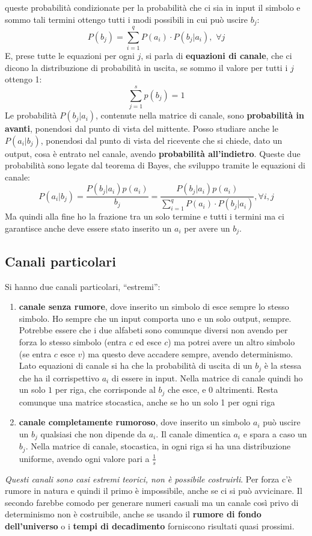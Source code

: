 \documentclass[a4paper,12pt, oneside]{book}
\begin{document}
queste probabilità condizionate per la probabilità che ci sia in input il
simbolo e sommo tali termini ottengo tutti i modi possibili in cui può uscire
$b_j$:
\[P(b_j)=\sum_{i=1}^q P(a_i)\cdot P(b_j|a_i),\,\,\forall j\]
E, prese tutte le equazioni per ogni $j$, si parla di \textbf{equazioni di
  canale}, che ci dicono la distribuzione di probabilità in uscita, se sommo il
valore per tutti i $j$ ottengo 1:
\[\sum_{j=1}^s p(b_j)=1\]
Le probabilità $P(b_j|a_i)$, contenute nella matrice di canale, sono
\textbf{probabilità in avanti}, ponendosi dal punto di vista del mittente. Posso
studiare anche le $P(a_i|b_j)$, ponendosi dal 
punto di vista del ricevente che si chiede, dato un output, cosa è entrato nel
canale, avendo \textbf{probabilità all'indietro}. Queste due probabilità
sono legate dal teorema di Bayes, che sviluppo tramite le equazioni di canale:
\[P(a_i|b_j)=\frac{P(b_j|a_i)p(a_i)}{b_j}=\frac{P(b_j|a_i)p(a_i)}{\sum_{i=1}^q
    P(a_i)\cdot P(b_j|a_i)},\forall i,j\]
Ma quindi alla fine ho la frazione tra un solo termine e tutti i termini ma ci
garantisce anche deve essere stato inserito un $a_i$ per avere un $b_j$.
\subsection{Canali particolari}
Si hanno due canali particolari, ``estremi'':
\begin{enumerate}
  \item \textbf{canale senza rumore}, dove inserito un simbolo di esce
  sempre lo stesso simbolo. Ho sempre che un input comporta uno e un solo
  output, sempre. Potrebbe essere che i due alfabeti sono comunque diversi non
  avendo per forza lo stesso simbolo (entra $c$ ed esce $c$) ma potrei avere un
  altro simbolo (se entra $c$ esce $v$) ma questo deve accadere sempre, avendo
  determinismo. Lato equazioni di canale si ha che la probabilità di uscita di 
  un $b_j$ è la stessa che ha il corrispettivo $a_i$ di essere in input. Nella
  matrice di canale quindi ho un solo $1$ per riga, che corrisponde al $b_j$ che
  esce, e 0 altrimenti. Resta comunque una matrice stocastica, anche se ho un
  solo 1 per ogni riga
  \item \textbf{canale completamente rumoroso}, dove inserito un simbolo $a_i$
  può uscire un $b_j$ qualsiasi che non dipende da $a_i$. Il canale dimentica
  $a_i$ e spara a caso un $b_j$. Nella matrice di canale, stocastica, in ogni
  riga si ha una 
  distribuzione uniforme, avendo ogni valore pari a $\frac{1}{s}$
\end{enumerate}
\textit{Questi canali sono casi estremi teorici, non è possibile
  costruirli}. Per forza c'è rumore in natura e quindi il primo è
impossibile, anche se ci si può avvicinare. Il secondo farebbe comodo per
generare numeri casuali ma un canale 
così privo di determinismo non è costruibile, anche se usando il \textbf{rumore
  di fondo dell'universo} o i \textbf{tempi di decadimento} forniscono risultati
quasi prossimi.
\end{document}
